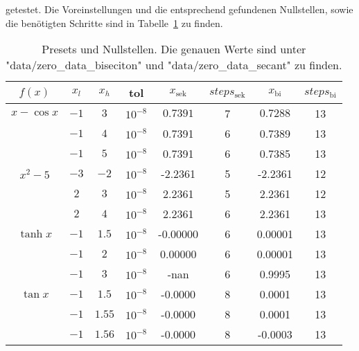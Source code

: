 \documentclass[10pt]{article}
\begin{document}
\begin{multicols}{2}
getestet. Die Voreinstellungen und die entsprechend gefundenen Nullstellen, sowie die benötigten Schritte sind in Tabelle~\ref{Tab:Tcr} zu finden.\\
\end{multicols}
  \begin{table}[h]
\begin{center}
    \caption{Presets und Nullstellen. Die genauen Werte sind unter "data/zero\_data\_biseciton" und "data/zero\_data\_secant" zu finden.}
    
\begin{tabular}{|cccccccc|}
  \hline
\(f(x)\)&\(x_l\)&\(x_h\)&tol&\(x_{\text{sek}}\)&\(steps_{\text{sek}}\)&\(x_{\text{bi}}\)&\(steps_{\text{bi}}\)\\
  \hline
  \(x-\cos{x}\)&\(-1\)&\(3\)&\(10^{-8}\)&\(0.7391\)&7&\(0.7288\)&13\\
  \(\)&\(-1\)&\(4\)&\(10^{-8}\)&0.7391&6&0.7389&13\\
  \(\)&\(-1\)&\(5\)&\(10^{-8}\)&0.7391&6&0.7385&13\\
  \hline
  \(x^2-5\)&\(-3\)&\(-2\)&\(10^{-8}\)&-2.2361&5&-2.2361&12\\
  \(\)&\(2\)&\(3\)&\(10^{-8}\)&2.2361&5&2.2361&12\\
  \(\)&\(2\)&\(4\)&\(10^{-8}\)&2.2361&6&2.2361&13\\
  \hline
  \(\tanh{x}\)&\(-1\)&\(1.5\)&\(10^{-8}\)&-0.00000&6&0.00001&13\\
  \(\)&\(-1\)&\(2\)&\(10^{-8}\)&0.00000&6&0.00001&13\\
  \(\)&\(-1\)&\(3\)&\(10^{-8}\)&-nan&6&0.9995&13\\
  \hline
  \(\tan{x}\)&\(-1\)&\(1.5\)&\(10^{-8}\)&-0.0000&8&0.0001&13\\
  \(\)&\(-1\)&\(1.55\)&\(10^{-8}\)&-0.0000&8&0.0001&13\\
  \(\)&\(-1\)&\(1.56\)&\(10^{-8}\)&-0.0000&8&-0.0003&13\\
  \hline
\end{tabular}
\label{Tab:Tcr}
\end{center}
  \end{table}
\end{document}
